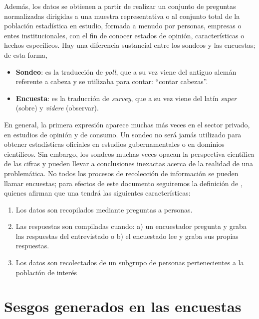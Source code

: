 \documentclass[
  12pt,
  spanish,
]{book}
\providecommand{\tightlist}{%
  \setlength{\itemsep}{0pt}\setlength{\parskip}{0pt}}
\begin{document}
Además, los datos se obtienen a partir de realizar un conjunto de preguntas normalizadas dirigidas a una muestra representativa o al conjunto total de la población estadística en estudio, formada a menudo por personas, empresas o entes institucionales, con el fin de conocer estados de opinión, características o hechos específicos. Hay una diferencia sustancial entre los sondeos y las encuestas; de esta forma,

\begin{itemize}
\tightlist
\item
  \textbf{Sondeo}: es la traducción de \emph{poll}, que a su vez viene del antiguo alemán referente a cabeza y se utilizaba para contar: ``contar cabezas''.
\item
  \textbf{Encuesta}: es la traducción de \emph{survey}, que a su vez viene del latín \emph{super} (sobre) y \emph{videre} (observar).
\end{itemize}

En general, la primera expresión aparece muchas más veces en el sector privado, en estudios de opinión y de consumo. Un sondeo no será jamás utilizado para obtener estadísticas oficiales en estudios gubernamentales o en dominios científicos. Sin embargo, los sondeos muchas veces opacan la perspectiva científica de las cifras y pueden llevar a conclusiones inexactas acerca de la realidad de una problemática. No todos los procesos de recolección de información se pueden llamar encuestas; para efectos de este documento seguiremos la definición de \citet{Groves_Fowler_Couper_Lepkowski_Singer_Tourangeau_2009}, quienes afirman que una tendrá las siguientes características:

\begin{enumerate}
\def\labelenumi{\arabic{enumi}.}
\tightlist
\item
  Los datos son recopilados mediante preguntas a personas.
\item
  Las respuestas son compiladas cuando: a) un encuestador pregunta y graba las respuestas del entrevistado o b) el encuestado lee y graba sus propias respuestas.
\item
  Los datos son recolectados de un subgrupo de personas pertenecientes a la población de interés
\end{enumerate}

\hypertarget{sesgos-generados-en-las-encuestas}{%
\section{Sesgos generados en las encuestas}\label{sesgos-generados-en-las-encuestas}}
\end{document}
